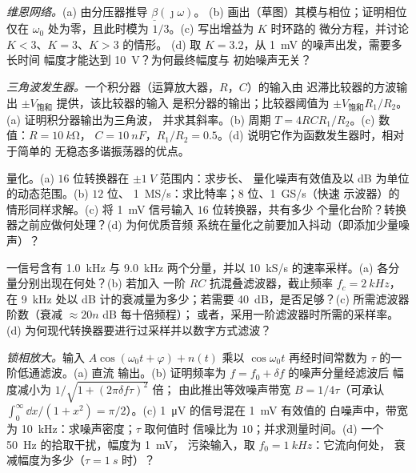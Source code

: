 \begin{exercise}[$\star\star$]\label{exo:b2:feedback-oscillators:6}
\emph{维恩网络。}(a) 由分压器推导 $\underline\beta(\jmath\omega)$。
(b) 画出（草图）其模与相位；证明相位仅在
$\omega_0$ 处为零，且此时模为 $1/3$。(c) 写出增益为 $K$ 时环路的
微分方程，并讨论 $K < 3$、$K = 3$、$K > 3$ 的情形。
(d) 取 $K = 3.2$，从 \qty{1}{mV} 的噪声出发，需要多长时间
幅度才能达到 \qty{10}{V}？为何最终幅度与
初始噪声无关？
\end{exercise}

\begin{exercise}[$\star\star$]\label{exo:b2:feedback-oscillators:7}
\emph{三角波发生器。}一个积分器（运算放大器，$R$，$C$）的输入由
迟滞比较器的方波输出 $\pm V_{\text{饱和}}$ 提供，该比较器的输入
是积分器的输出；比较器阈值为
$\pm V_{\text{饱和}}R_1/R_2$。(a) 证明积分器输出为三角波，
并求其斜率。(b) 周期 $T = 4RCR_1/R_2$。(c) 数值：$R = \qty{10}{k\ohm}$，
$C = \qty{10}{nF}$，$R_1/R_2 = 0.5$。(d) 说明它作为函数发生器时，相对于简单的
无稳态多谐振荡器的优点。
\end{exercise}

\begin{exercise}[$\star\star$]\label{exo:b2:feedback-oscillators:8}
量化。(a) $16$ 位转换器在 $\pm\qty{1}{V}$ 范围内：求步长、
量化噪声有效值及以 dB 为单位的动态范围。(b) $12$ 位、
\qty{1}{MS/s}：求比特率；$8$ 位、\qty{1}{GS/s}（快速
示波器）的情形同样求解。(c) 将 \qty{1}{mV} 信号输入 $16$ 位转换器，共有多少
个量化台阶？转换器之前应做何处理？(d) 为何优质音频
系统在量化之前要加入抖动（即添加少量噪声）？
\end{exercise}

\begin{exercise}[$\star\star$]\label{exo:b2:feedback-oscillators:9}
一信号含有 \qty{1.0}{kHz} 与 \qty{9.0}{kHz} 两个分量，并以
\qty{10}{kS/s} 的速率采样。(a) 各分量分别出现在何处？(b) 若加入
一阶 $RC$ 抗混叠滤波器，截止频率 $f_c = \qty{2}{kHz}$，
在 \qty{9}{kHz} 处以 dB 计的衰减量为多少；若需要 \qty{40}{dB}，是否足够？(c)
所需滤波器阶数（衰减 $\approx 20n$ dB 每十倍频程）；
或者，采用一阶滤波器时所需的采样率。(d)
为何现代转换器要进行过采样并以数字方式滤波？
\end{exercise}

\begin{exercise}[$\star\star\star$]\label{exo:b2:feedback-oscillators:10}
\emph{锁相放大。}输入 $A\cos(\omega_0t + \varphi) + n(t)$ 乘以 $\cos\omega_0t$
再经时间常数为 $\tau$ 的一阶低通滤波。(a) 直流
输出。(b) 证明频率为 $f = f_0 + \delta f$ 的噪声分量经滤波后
幅度减小为 $1/\sqrt{1 + (2\pi\delta f\tau)^2}$ 倍；
由此推出等效噪声带宽 $B = 1/4\tau$（可承认 $\int_0^\infty
\dd x/(1 + x^2) = \pi/2$）。(c) \qty{1}{\micro V} 的信号混在 \qty{1}{mV} 有效值的
白噪声中，带宽为 \qty{10}{kHz}：求噪声密度；$\tau$ 取何值时
信噪比为 $10$；并求测量时间。(d) 一个 \qty{50}{Hz} 的拾取干扰，幅度为 \qty{1}{mV}，
污染输入，取 $f_0 = \qty{1}{kHz}$：它流向何处，
衰减幅度为多少（$\tau = \qty{1}{s}$ 时）？
\end{exercise}

